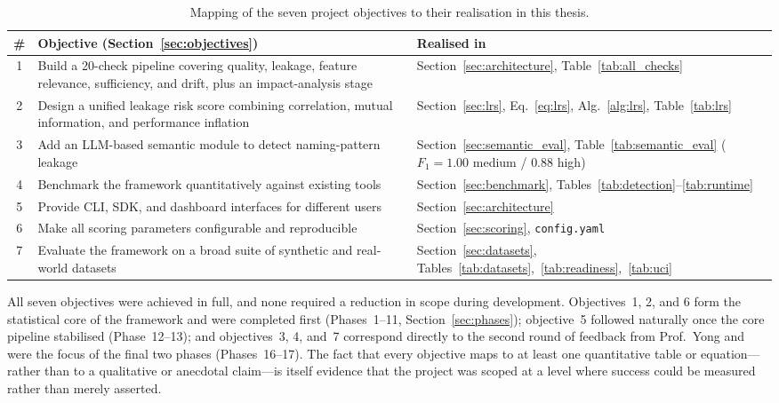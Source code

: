 \documentclass[12pt,a4paper]{report}
\newcommand{\tblhead}{\rowcolor{tblHeadBg}\color{white}\bfseries}
\begin{document}
\begin{table}[!ht]
\centering
\caption{Mapping of the seven project objectives to their realisation in this thesis.}
\label{tab:objectives}
\scriptsize
{}
\begin{tabularx}{\textwidth}{cXX}
\toprule
\tblhead \textbf{\#} & \textbf{Objective (Section~\ref{sec:objectives})} & \textbf{Realised in} \\
\midrule
1 & Build a 20-check pipeline covering quality, leakage, feature relevance, sufficiency, and drift, plus an impact-analysis stage & Section~\ref{sec:architecture}, Table~\ref{tab:all_checks} \\
2 & Design a unified leakage risk score combining correlation, mutual information, and performance inflation & Section~\ref{sec:lrs}, Eq.~\eqref{eq:lrs}, Alg.~\ref{alg:lrs}, Table~\ref{tab:lrs} \\
3 & Add an LLM-based semantic module to detect naming-pattern leakage & Section~\ref{sec:semantic_eval}, Table~\ref{tab:semantic_eval} ($F_1{=}1.00$ medium / $0.88$ high) \\
4 & Benchmark the framework quantitatively against existing tools & Section~\ref{sec:benchmark}, Tables~\ref{tab:detection}--\ref{tab:runtime} \\
5 & Provide CLI, SDK, and dashboard interfaces for different users & Section~\ref{sec:architecture} \\
6 & Make all scoring parameters configurable and reproducible & Section~\ref{sec:scoring}, \texttt{config.yaml} \\
7 & Evaluate the framework on a broad suite of synthetic and real-world datasets & Section~\ref{sec:datasets}, Tables~\ref{tab:datasets},~\ref{tab:readiness},~\ref{tab:uci} \\
\bottomrule
\end{tabularx}
\end{table}

All seven objectives were achieved in full, and none required a reduction in scope during
development.  Objectives~1, 2, and 6 form the statistical core of the framework and were
completed first (Phases~1--11, Section~\ref{sec:phases}); objective~5 followed naturally once
the core pipeline stabilised (Phase~12--13); and objectives~3, 4, and~7 correspond directly to
the second round of feedback from Prof.\ Yong and were the focus of the final two phases
(Phases~16--17).  The fact that every objective maps to at least one quantitative table or
equation---rather than to a qualitative or anecdotal claim---is itself evidence that the
project was scoped at a level where success could be measured rather than merely asserted.
\end{document}

